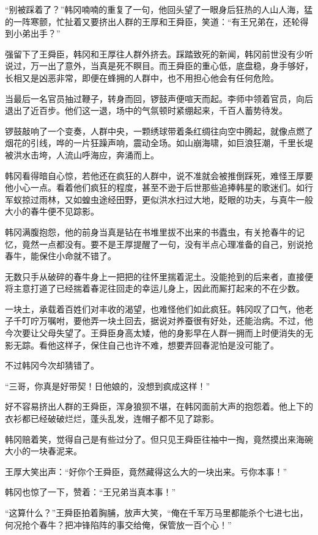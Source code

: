 “别被踩着了？”韩冈喃喃的重复了一句，他回头望了一眼身后狂热的人山人海，猛的一阵寒颤，忙扯着又要挤出人群的王厚和王舜臣，笑道：“有王兄弟在，还轮得到小弟出手？”

强留下了王舜臣，韩冈和王厚往人群外挤去。踩踏致死的新闻，韩冈前世没有少听说过，万一出了意外，当真是死不瞑目。而王舜臣的重心低，底盘稳，身手够好，长相又是凶恶非常，即便在蜂拥的人群中，也不用担心他会有任何危险。

当最后一名官员抽过鞭子，转身而回，锣鼓声便喧天而起。李师中领着官员，向后退出了近百步。他们这一退，场中的气氛顿时紧绷起来，千百人蓄势待发。

锣鼓敲响了一个变奏，人群中央，一颗绣球带着条红绸往向空中腾起，就像点燃了烟花的引线，哗的一片狂躁声响，震动全场。如山崩海啸，如巨浪狂潮，千里长堤被洪水击垮，人流山呼海应，奔涌而上。

韩冈看得暗自心惊，若他还在疯狂的人群中，说不准就会被推倒踩死，难怪王厚要他小心一点。看着他们疯狂的程度，甚至不逊于后世那些追捧韩星的歌迷们。如行军蚁掠过雨林，又如蝗虫途经田野，更似洪水扫过大地，眨眼的功夫，与真牛一般大小的春牛便不见踪影。

韩冈满腹抱怨，他的前身当真是钻在书堆里拔不出来的书蠹虫，有关抢春牛的记忆，竟然一点都没有。要不是王厚提醒了一句，没有半点心理准备的自己，别说抢春牛，能保住小命就不错了。

无数只手从破碎的春牛身上一把把的往怀里揣着泥土。没能抢到的后来者，直接便将主意打道了已经揣着春泥往回走的幸运儿身上，因此而厮打起来的不在少数。

一块土，承载着百姓们对丰收的渴望，也难怪他们如此疯狂。韩冈叹了口气，他老子千叮咛万嘱咐，要他弄一块土回去，据说对养蚕很有好处，还能治病。不过，他今次要让父母失望了。王舜臣身高太矮，他的身影早在人群一拥而上时便消失的无影无踪。看他这样子，保住自己也许不难，想要弄回春泥怕是没可能了。

不过韩冈今次却猜错了。

“三哥，你真是好带契！日他娘的，没想到疯成这样！”

好不容易挤出人群的王舜臣，浑身狼狈不堪，在韩冈面前大声的抱怨着。他上下的衣衫都已经破破烂烂，蓬头乱发，连帽子都不见了踪影。

韩冈赔着笑，觉得自己是有些过分了。但只见王舜臣往袖中一掏，竟然摸出来海碗大小的一块春泥来。

王厚大笑出声：“好你个王舜臣，竟然藏得这么大的一块出来。亏你本事！”

韩冈也惊了一下，赞着：“王兄弟当真本事！”

“这算什么？”王舜臣拍着胸脯，放声大笑，“俺在千军万马里都能杀个七进七出，何况抢个春牛？把冲锋陷阵的事交给俺，保管放一百个心！”

